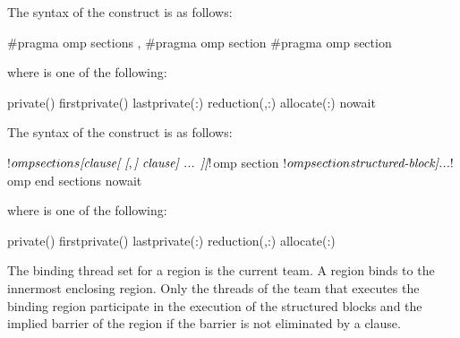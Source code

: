 \clearpage  %
\syntax
\begin{ccppspecific}
The syntax of the  construct is as follows:

\begin{ompcPragma}
#pragma omp sections \plc{[clause[ [},\plc{] clause] ... ] new-line}
   {
   \plc{[}#pragma omp section \plc{]}
   \plc{[}#pragma omp section 
      \plc{structured-block]}
   }
\end{ompcPragma}

where  is one of the following:

{}
\begin{indentedcodelist}
private()
firstprivate()
lastprivate(\plc{[ lastprivate-modifier}:\plc{] list})
reduction(\plc{[reduction-modifier },\plc{] reduction-identifier }:)
allocate(\plc{[allocator }:\plc{] list})
nowait
\end{indentedcodelist}
\end{ccppspecific}

\begin{fortranspecific}
The syntax of the  construct is as follows:

\begin{ompfPragma}
!$omp sections \plc{[clause[ [},\plc{] clause] ... ]}
   \plc{[}!$omp section\plc{]}
   \plc{[}!$omp section
      \plc{structured-block]}
   \plc{...}
!$omp end sections \plc{[}nowait\plc{]}
\end{ompfPragma}

\begin{samepage}
where  is one of the following:

{}
\begin{indentedcodelist}
private()
firstprivate()
lastprivate(\plc{[ lastprivate-modifier}:\plc{] list})
reduction(\plc{[reduction-modifier },\plc{] reduction-identifier }:)
allocate(\plc{[allocator }:\plc{] list})
\end{indentedcodelist}
\end{samepage}
\end{fortranspecific}

\binding
The binding thread set for a  region is the current team. A 
 region binds to the innermost enclosing  region. 
Only the threads of the team that executes the binding  region 
participate in the execution of the structured blocks and the implied barrier 
of the  region if the barrier is not eliminated by a 
 clause.

